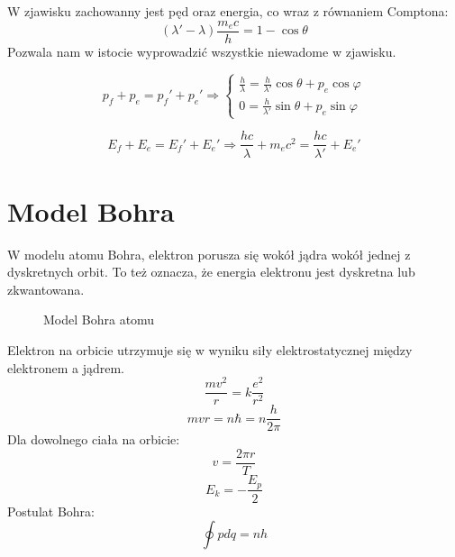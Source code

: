 \documentclass{../notatki}
\begin{document}
W zjawisku zachowanny jest pęd oraz energia, co wraz z równaniem Comptona:
$$
(\lambda' - \lambda) \frac{m_ec}{h} = 1 - \cos\theta
$$
Pozwala nam w istocie wyprowadzić wszystkie niewadome w zjawisku.

$$
p_f + p_e = p_f' + p_e' \Rightarrow
\begin{cases}
  \frac{h}{\lambda} = \frac{h}{\lambda'}\cos\theta + p_e\cos\varphi \\
  0 = \frac{h}{\lambda'}\sin\theta + p_e\sin\varphi
\end{cases}
$$

$$
E_f + E_e = E_f' + E_e' \Rightarrow \frac{hc}{\lambda} + m_ec^2 =
\frac{hc}{\lambda'} + E_e'
$$

\section{Model Bohra}

W modelu atomu Bohra, elektron porusza się wokół jądra wokół jednej z
dyskretnych
orbit. To też oznacza, że energia elektronu jest dyskretna lub zkwantowana.

\begin{figure}[h]
  \centering
  \caption{Model Bohra atomu}
\end{figure}

Elektron na orbicie utrzymuje się w wyniku siły elektrostatycznej między
elektronem a jądrem.
$$
\frac{mv^2}{r} = k \frac{e^2}{r^2}
$$
$$
mvr = n\hbar = n\frac{h}{2\pi}
$$
Dla dowolnego ciała na orbicie:
$$
v = \frac{2\pi r}{T}
$$
$$
E_k = - \frac{E_p}{2}
$$
Postulat Bohra:
$$
\oint pdq = nh
$$
\end{document}
